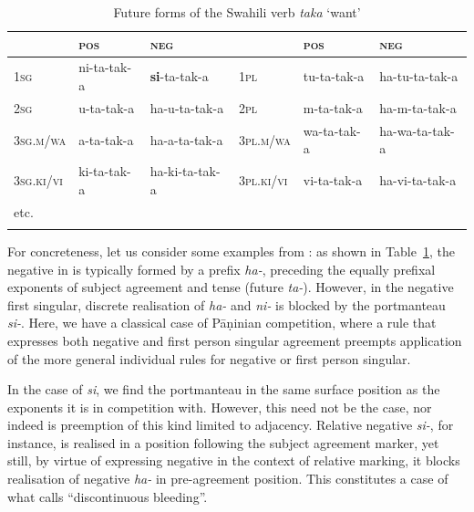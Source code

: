 \documentclass[output=paper
	        ,collection
	        ,collectionchapter
 	        ,biblatex
                ,babelshorthands
                ,newtxmath
                ,draftmode
                ,colorlinks, citecolor=brown
]{langscibook}
\begin{document}
\begin{exe}
\begin{xlist}
\begin{exe}
\begin{xlist}

\begin{table}
\setlength{\tabcolsep}{.3em}
\centering
\begin{tabular}{llllll}
\lsptoprule 
 & \textsc{pos} & \textsc{neg}     &             & \textsc{pos} & \textsc{neg}\\
\midrule 
\textsc{1sg} & ni-{ta}-tak-{a} & \textbf{{si}}-{ta}-tak-{a}        & \textsc{1pl} & tu-{ta}-tak-{a}     & {ha}-tu-{ta}-tak-{a}\\
\textsc{2sg} & u-{ta}-tak-{a} & {ha}-u-{ta}-tak-{a}        & \textsc{2pl} & m-{ta}-tak-{a}      & {ha}-m-{ta}-tak-{a}\\
\textsc{3sg.m/wa} & a-{ta}-tak-{a} & {ha}-a-{ta}-tak-{a}    & \textsc{3pl.m/wa} & wa-{ta}-tak-{a} & {ha}-wa-{ta}-tak-{a}\\ 
\textsc{3sg.ki/vi} & ki-{ta}-tak-{a} & {ha}-ki-{ta}-tak-{a} & \textsc{3pl.ki/vi} & vi-{ta}-tak-{a} & {ha}-vi-{ta}-tak-{a}\\
etc. & &\\
\lspbottomrule
\end{tabular}
\caption{Future forms of the Swahili verb  \textit{taka} ‘want’}
\label{tab:SwahiliPortmanteau}
\end{table}

For concreteness, let us consider some examples from : as shown
in Table~\ref{tab:SwahiliPortmanteau}, the negative in  is
typically formed by a prefix \textit{ha-}, preceding the equally
prefixal exponents of
subject agreement and tense (future \textit{ta-}). However, in the
negative first singular, discrete realisation of \textit{ha-} and
\textit{ni-} is blocked by the portmanteau \textit{si-}. Here, we have
a classical case of   Pāṇinian competition, where a rule that
expresses both negative and first person singular agreement preempts
application of the more general individual rules for negative or first
person singular.  



In the case of \textit{si}, we find the portmanteau in the same
surface position as the exponents it is in competition with.  However,
this need not be the case, nor indeed is preemption of this kind
limited to adjacency. Relative negative \textit{si-}, for instance, is
realised in a position following the subject agreement marker, yet
still, by virtue of expressing negative in the context of relative
marking, it blocks realisation of negative \textit{ha-} in
pre-agreement position. This constitutes a case of what
\citet{Noyer92} calls ``discontinuous bleeding''.


\end{xlist}
\end{exe}
\end{xlist}
\end{exe}
\end{document}
